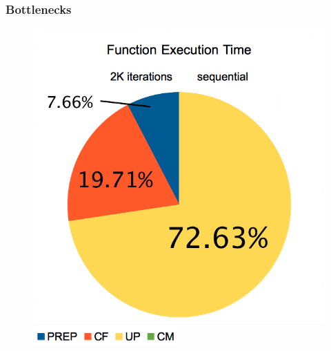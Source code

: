 \documentclass{beamer}
\begin{document}
\begin{frame}
	\frametitle{Bottlenecks}
	\begin{figure}
		\begin{center}
			\includegraphics[height=0.75\textheight]{images/may/loadseq.png}
			
			\includegraphics[width=0.5\textwidth]{images/may/legend.png}
		\end{center}
	\end{figure}
\end{frame}
\end{document}
